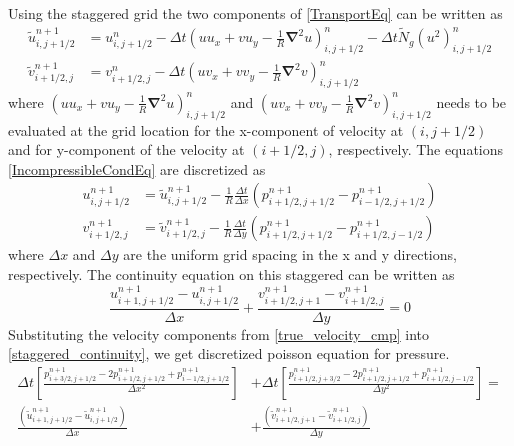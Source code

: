 \documentclass[12pt]{report}   %
\newcommand{\grad}{\mathbf{\nabla}}
\newcommand{\Ndg}{\tilde{N}_g}
\begin{document}
Using the staggered grid the two components of \eqref{TransportEq} can be written as
\begin{equation}
\begin{split}
 \tilde{u}_{i,j+1/2}^{n+1} &= u_{i,j+1/2}^n - \Delta t \left(u u_x + vu_y -\frac{1}{R}\grad^2u \right)_{i,j+1/2}^n -\Delta t\Ndg (u^2)_{i,j+1/2}^n\\
 \tilde{v}_{i+1/2,j}^{n+1} &= v_{i+1/2,j}^n - \Delta t \left(u v_x + vv_y -\frac{1}{R}\grad^2v \right)_{i,j+1/2}^n
\end{split}
\end{equation}
where $\left(u u_x + vu_y -\frac{1}{R}\grad^2u \right)_{i,j+1/2}^n$ and $\left(u v_x + vv_y -\frac{1}{R}\grad^2v \right)_{i,j+1/2}^n$
needs to be evaluated at the grid location for the x-component of velocity at $(i,j+1/2)$ and for y-component of the velocity at $(i+1/2,j)$, respectively. The equations \eqref{IncompressibleCondEq} are discretized as 
\begin{equation}
\begin{split}
 u^{n+1}_{i,j+1/2} &= \tilde{u}^{n+1}_{i,j+1/2} -\frac{1}{R} \frac{\Delta t}{\Delta x} \left(p_{i+1/2,j+1/2}^{n+1} -p_{i-1/2,j+1/2}^{n+1} \right)\\
 v^{n+1}_{i+1/2,j} &= \tilde{v}^{n+1}_{i+1/2,j} -\frac{1}{R} \frac{\Delta t}{\Delta y} \left(p_{i+1/2,j+1/2}^{n+1} -p_{i+1/2,j-1/2}^{n+1} \right)
 \end{split}
 \label{true_velocity_cmp}
\end{equation}
where $\Delta x$ and $\Delta y$ are the uniform grid spacing in the x and y directions, respectively. The continuity equation on this staggered can be written as 
\begin{equation}
 \frac{ u_{i+1,j+1/2}^{n+1}-u_{i,j+1/2}^{n+1} }{ \Delta x } +\frac{v_{i+1/2,j+1}^{n+1}-v_{i+1/2,j}^{n+1} }{\Delta y} = 0
 \label{staggered_continuity}
 \end{equation}
Substituting the velocity components from \eqref{true_velocity_cmp} into \eqref{staggered_continuity}, we get discretized poisson equation for pressure.
\begin{equation}
\begin{split}
  \Delta t \left[\frac{p_{i+3/2,j+1/2}^{n+1}-2p_{i+1/2,j+1/2}^{n+1}+p_{i-1/2,j+1/2}^{n+1}}{\Delta x^2} \right] &+
 \Delta t \left[ \frac{p_{i+1/2,j+3/2}^{n+1}-2p_{i+1/2,j+1/2}^{n+1}+p_{i+1/2,j-1/2}^{n+1}}{\Delta y^2}   \right] = \\
 \frac{\left(\tilde{u}_{i+1,j+1/2}^{n+1}-
  \tilde{u}_{i,j+1/2}^{n+1}  \right) }{\Delta x}&+\frac{\left(\tilde{v}_{i+1/2,j+1}^{n+1}-\tilde{v}_{i+1/2,j}^{n+1}  \right)}{\Delta y}
\end{split}
\end{equation}
\end{document}
